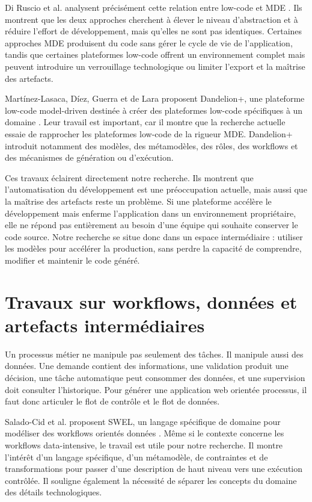 \documentclass[12pt,a4paper]{article}
\begin{document}
Di Ruscio et al. analysent précisément cette relation entre low-code et MDE \cite{diruscio2022}. Ils montrent que les deux approches cherchent à élever le niveau d'abstraction et à réduire l'effort de développement, mais qu'elles ne sont pas identiques. Certaines approches MDE produisent du code sans gérer le cycle de vie de l'application, tandis que certaines plateformes low-code offrent un environnement complet mais peuvent introduire un verrouillage technologique ou limiter l'export et la maîtrise des artefacts.

Martínez-Lasaca, Díez, Guerra et de Lara proposent Dandelion+, une plateforme low-code model-driven destinée à créer des plateformes low-code spécifiques à un domaine \cite{martinez2026}. Leur travail est important, car il montre que la recherche actuelle essaie de rapprocher les plateformes low-code de la rigueur MDE. Dandelion+ introduit notamment des modèles, des métamodèles, des rôles, des workflows et des mécanismes de génération ou d'exécution.

Ces travaux éclairent directement notre recherche. Ils montrent que l'automatisation du développement est une préoccupation actuelle, mais aussi que la maîtrise des artefacts reste un problème. Si une plateforme accélère le développement mais enferme l'application dans un environnement propriétaire, elle ne répond pas entièrement au besoin d'une équipe qui souhaite conserver le code source. Notre recherche se situe donc dans un espace intermédiaire : utiliser les modèles pour accélérer la production, sans perdre la capacité de comprendre, modifier et maintenir le code généré.

\section{Travaux sur workflows, données et artefacts intermédiaires}

Un processus métier ne manipule pas seulement des tâches. Il manipule aussi des données. Une demande contient des informations, une validation produit une décision, une tâche automatique peut consommer des données, et une supervision doit consulter l'historique. Pour générer une application web orientée processus, il faut donc articuler le flot de contrôle et le flot de données.

Salado-Cid et al. proposent SWEL, un langage spécifique de domaine pour modéliser des workflows orientés données \cite{swel2023}. Même si le contexte concerne les workflows data-intensive, le travail est utile pour notre recherche. Il montre l'intérêt d'un langage spécifique, d'un métamodèle, de contraintes et de transformations pour passer d'une description de haut niveau vers une exécution contrôlée. Il souligne également la nécessité de séparer les concepts du domaine des détails technologiques.
\end{document}
